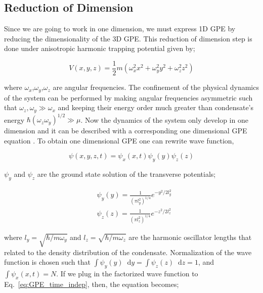 \documentclass[a4paper,times,hidelinks,12pt]{article}
\newcommand*\dif{\mathop{}\!\mathrm{d}}
\begin{document}
\subsection{Reduction of Dimension}

Since we are going to work in one dimension, we must express 1D GPE by reducing the dimensionality of the 3D GPE. This reduction of dimension step is done under anisotropic harmonic trapping potential given by;

\begin{equation}
\label{eq:GPE_harmonic_potential}
V(x, y, z) = \frac{1}{2}m(\omega_x^2 x^2 + \omega_y^2y^2 + \omega_z^2z^2)
\end{equation}


\noindent where $\omega_x$,$\omega_y$,$\omega_z$ are angular frequencies. The confinement of the physical dynamics of the system can be performed by making angular frequencies asymmetric such that $\omega_z, \omega_y \gg \omega_x$ and keeping their energy order much greater than condensate's energy $ \hbar(\omega_z \omega_y)^{1/2} \gg \mu $. Now the dynamics of the system only develop in one dimension and it can be described with a corresponding one dimensional GPE equation \cite{barenghi2016primer}. To obtain one dimensional GPE one can rewrite wave function,

\begin{equation}
\label{eq:GPE_time_indep_wave_func_seperated}
\psi(x, y, z, t) = \psi_x(x, t)\psi_y(y)\psi_z(z)
\end{equation}

\noindent $\psi_y$ and $\psi_z$ are the ground state solution of the transverse potentials;

\begin{equation}
\begin{split}
\label{eq:GPE_x_y_wave}
& \psi_y(y) = \frac{1}{{(\pi l_y^2)}^{1/4}}e^{-y^2/2l_y^2} \\
& \psi_z(z) = \frac{1}{{(\pi l_z^2)}^{1/4}}e^{-z^2/2l_z^2}
\end{split}
\end{equation}

\noindent where $l_y = \sqrt{\hbar/m\omega_y}$ and $l_z = \sqrt{\hbar/m\omega_z}$ are the harmonic oscillator lengths that related to the density distribution of the condensate. Normalization of the wave function is chosen such that $\int \psi_y(y) \dif y = \int \psi_z(z) \dif z = 1$, and $\int \psi_x(x, t) = N$. If we plug in the factorized wave function to Eq.~\eqref{eq:GPE_time_indep}, then, the equation becomes;
\end{document}
